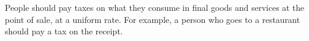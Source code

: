 People should pay taxes on what they consume in final goods and services at the point of sale, at a uniform rate. For example, a person who goes to a restaurant should pay a tax on the receipt.
